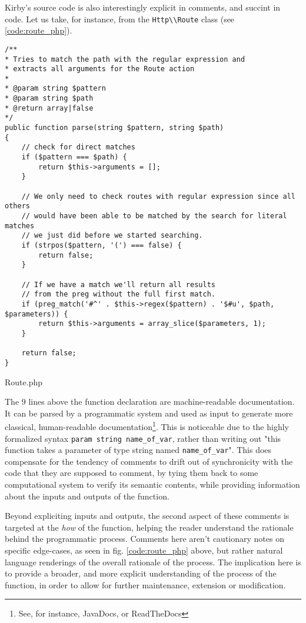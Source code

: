 Kirby's source code is also interestingly explicit in comments, and succint in code. Let us take, for instance, from the \lstinline{Http\\Route} class (see \ref{code:route_php}).

\begin{listing}
  \begin{verbatim}
/**
* Tries to match the path with the regular expression and
* extracts all arguments for the Route action
*
* @param string $pattern
* @param string $path
* @return array|false
*/
public function parse(string $pattern, string $path)
{
    // check for direct matches
    if ($pattern === $path) {
        return $this->arguments = [];
    }

    // We only need to check routes with regular expression since all others
    // would have been able to be matched by the search for literal matches
    // we just did before we started searching.
    if (strpos($pattern, '(') === false) {
        return false;
    }

    // If we have a match we'll return all results
    // from the preg without the full first match.
    if (preg_match('#^' . $this->regex($pattern) . '$#u', $path, $parameters)) {
        return $this->arguments = array_slice($parameters, 1);
    }

    return false;
}
\end{verbatim}
  \caption{Route.php}
  \label{code:route_php}
\end{listing}

The 9 lines above the function declaration are machine-readable documentation. It can be parsed by a programmatic system and used as input to generate more classical, human-readable documentation\footnote{See, for instance, JavaDocs, or ReadTheDocs}. This is noticeable due to the highly formalized syntax \lstinline{param string name_of_var}, rather than writing out "this function takes a parameter of type string named \lstinline{name_of_var}". This does compensate for the tendency of comments to drift out of synchronicity with the code that they are supposed to comment, by tying them back to some computational system to verify its semantic contents, while providing information about the inputs and outputs of the function.

Beyond expliciting inputs and outputs, the second aspect of these comments is targeted at the \emph{how} of the function, helping the reader understand the rationale behind the programmatic process. Comments here aren't cautionary notes on specific edge-cases, as seen in fig. \ref{code:route_php} above, but rather natural language renderings of the overall rationale of the process. The implication here is to provide a broader, and more explicit understanding of the process of the function, in order to allow for further maintenance, extension or modification.

